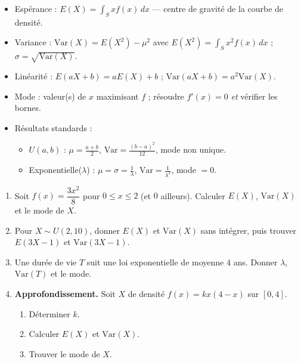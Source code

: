 \documentclass[11pt]{article}
\begin{document}
\begin{aretenir}
\begin{itemize}
\item Espérance : $E(X)=\displaystyle\int_S x f(x)\,dx$ — centre de gravité de la courbe de densité.
\item Variance : $\mathrm{Var}(X)=E(X^2)-\mu^2$ avec $E(X^2)=\displaystyle\int_S x^2 f(x)\,dx$ ; $\sigma=\sqrt{\mathrm{Var}(X)}$.
\item Linéarité : $E(aX+b)=aE(X)+b$ ; \quad $\mathrm{Var}(aX+b)=a^2\mathrm{Var}(X)$.
\item Mode : valeur(s) de $x$ maximisant $f$ ; résoudre $f'(x)=0$ \emph{et} vérifier les bornes.
\item Résultats standards :
      \begin{itemize}
      \item $U(a,b)$ : $\mu=\tfrac{a+b}{2}$, $\mathrm{Var}=\tfrac{(b-a)^2}{12}$, mode non unique.
      \item Exponentielle($\lambda$) : $\mu=\sigma=\tfrac{1}{\lambda}$, $\mathrm{Var}=\tfrac{1}{\lambda^2}$, mode $=0$.
      \end{itemize}
\end{itemize}
\end{aretenir}

\begin{exercice}[Entraînement]
\begin{enumerate}
\item Soit $f(x)=\dfrac{3x^2}{8}$ pour $0\le x\le 2$ (et $0$ ailleurs). Calculer $E(X)$, $\mathrm{Var}(X)$ et le mode de $X$.
\item Pour $X\sim U(2,10)$, donner $E(X)$ et $\mathrm{Var}(X)$ sans intégrer, puis trouver $E(3X-1)$ et $\mathrm{Var}(3X-1)$.
\item Une durée de vie $T$ suit une loi exponentielle de moyenne $4$ ans. Donner $\lambda$, $\mathrm{Var}(T)$ et le mode.
\item \textbf{Approfondissement.} Soit $X$ de densité $f(x)=kx(4-x)$ sur $[0,4]$.
      \begin{enumerate}
      \item Déterminer $k$.
      \item Calculer $E(X)$ et $\mathrm{Var}(X)$.
      \item Trouver le mode de $X$.
      \end{enumerate}
\end{enumerate}
\end{exercice}
\end{document}
